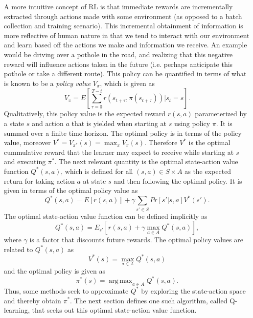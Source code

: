 \documentclass{article} %
\DeclareMathOperator*{\argmax}{arg\,max}
\begin{document}
 A more intuitive concept of RL is that immediate rewards are incrementally extracted through actions made with some environment (as opposed to a batch collection and training scenario). This incremental obtainment of information is more reflective of human nature in that we tend to interact with our environment and learn based off the actions we make and information we receive. An example would be driving over a pothole in the road, and realizing that this negative reward will influence actions taken in the future (i.e. perhaps anticipate this pothole or take a different route). This policy can be quantified in terms of what is known to be a \textit{policy value} $V_{\pi}$, which is given as 
$$
V_{\pi} = E[\sum_{\tau = 0}^{T-t}r(s_{t+\tau},\pi(s_{t+\tau}))|s_t = s].
$$
Qualitatively, this policy value is the expected reward $r(s,a)$ parameterized by a state $s$ and action $a$ that is yielded when starting at $s$ using policy $\pi$. It is summed over a finite time horizon. The optimal policy is in terms of the policy value, moreover $V^{*}=V_{\pi^*}(s) = \max_{\pi} V_{\pi}(s)$. Therefore $V^{*}$ is the optimal cummulative reward that the learner may expect to receive while starting at $s$ and executing $\pi^*$. The next relevant quantity is the optimal state-action value function $Q^*(s,a)$, which is defined for all $(s,a) \in S \times A$ as the expected return for taking action $a$ at state $s$ and then following the optimal policy.  It is given in terms of the optimal policy value as
$$
Q^*(s,a) = E[r(s,a)] + \gamma \sum_{s' \in S}Pr[s' | s,a]V^*(s').
$$
The optimal state-action value function can be defined implicitly as
$$
Q^*(s,a) = E_{s'}[r(s,a) + \gamma \max_{a \in A}Q^*(s,a)],
$$
where $\gamma$ is a factor that discounts future rewards.  The optimal policy values are related to $Q^*(s,a)$ as 
$$V^*(s) = \max_{a\in A} Q^*(s,a)$$
and the optimal policy is given as 
$$\pi^*(s) = \argmax_{a\in A} Q^*(s,a).$$
Thus, some methods seek to approximate $Q^*$ by exploring the state-action space and thereby obtain $\pi^*$.
The next section defines one such algorithm, called Q-learning, that seeks out this optimal state-action value function. 
\end{document}
